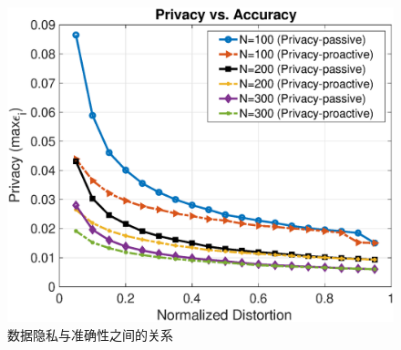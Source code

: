 	\begin{figure}[!t]
			\centering
			\includegraphics[scale=0.5]{./pic/privacy_vs_accuracy4.eps}
			\caption{数据隐私与准确性之间的关系}\label{fg:privacy}
	\end{figure}	
	
	
	
	
	
		
